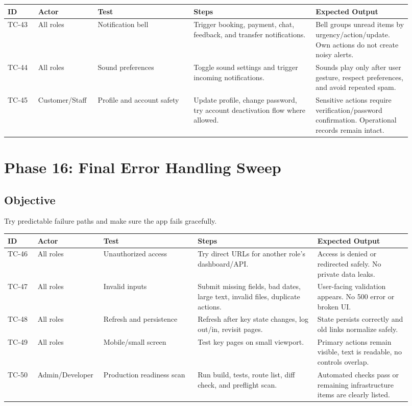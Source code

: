 \documentclass[11pt,a4paper]{article}
\begin{document}
\begin{longtable}{p{0.07\linewidth}p{0.13\linewidth}p{0.22\linewidth}p{0.28\linewidth}p{0.22\linewidth}}
\toprule
\textbf{ID} & \textbf{Actor} & \textbf{Test} & \textbf{Steps} & \textbf{Expected Output} \\
\midrule
TC-43 & All roles & Notification bell & Trigger booking, payment, chat, feedback, and transfer notifications. & Bell groups unread items by urgency/action/update. Own actions do not create noisy alerts. \\
TC-44 & All roles & Sound preferences & Toggle sound settings and trigger incoming notifications. & Sounds play only after user gesture, respect preferences, and avoid repeated spam. \\
TC-45 & Customer/Staff & Profile and account safety & Update profile, change password, try account deactivation flow where allowed. & Sensitive actions require verification/password confirmation. Operational records remain intact. \\
\bottomrule
\end{longtable}

\section{Phase 16: Final Error Handling Sweep}
\subsection{Objective}
Try predictable failure paths and make sure the app fails gracefully.

\begin{longtable}{p{0.07\linewidth}p{0.13\linewidth}p{0.22\linewidth}p{0.28\linewidth}p{0.22\linewidth}}
\toprule
\textbf{ID} & \textbf{Actor} & \textbf{Test} & \textbf{Steps} & \textbf{Expected Output} \\
\midrule
TC-46 & All roles & Unauthorized access & Try direct URLs for another role's dashboard/API. & Access is denied or redirected safely. No private data leaks. \\
TC-47 & All roles & Invalid inputs & Submit missing fields, bad dates, large text, invalid files, duplicate actions. & User-facing validation appears. No 500 error or broken UI. \\
TC-48 & All roles & Refresh and persistence & Refresh after key state changes, log out/in, revisit pages. & State persists correctly and old links normalize safely. \\
TC-49 & All roles & Mobile/small screen & Test key pages on small viewport. & Primary actions remain visible, text is readable, no controls overlap. \\
TC-50 & Admin/Developer & Production readiness scan & Run build, tests, route list, diff check, and preflight scan. & Automated checks pass or remaining infrastructure items are clearly listed. \\
\bottomrule
\end{longtable}
\end{document}
